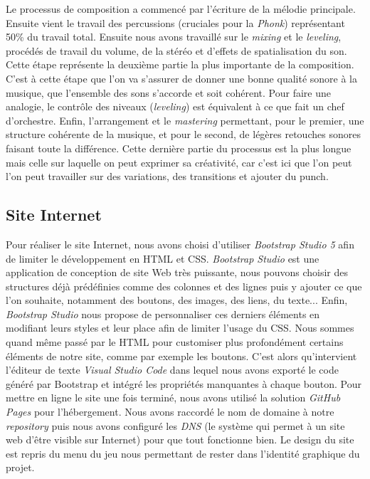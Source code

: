 \documentclass[12pt,a4paper]{article}
\begin{document}
        Le processus de composition a commencé par l'écriture de la mélodie principale. 
        Ensuite vient le travail des percussions (cruciales pour la \textsl{Phonk}) représentant 
        50\% du travail total. Ensuite nous avons travaillé sur le \textit{mixing} et 
        le \textit{leveling}, procédés de travail du volume, de la stéréo et d'effets de 
        spatialisation du son. Cette étape représente la deuxième partie la plus importante 
        de la composition. C'est à cette étape que l'on va s'assurer de donner une bonne qualité
        sonore à la musique, que l'ensemble des sons s'accorde et soit cohérent. Pour faire
        une analogie, le contrôle des niveaux (\textit{leveling}) est équivalent à ce que fait un chef
        d'orchestre. Enfin, l'arrangement et le \textit{mastering} permettant, pour le premier, une 
        structure cohérente de la musique, et pour le second, de légères retouches
        sonores faisant toute la différence. Cette dernière partie du processus 
        est la plus longue mais celle sur laquelle on peut exprimer sa créativité,
        car c'est ici que l'on peut l'on peut travailler sur des variations, 
        des transitions et ajouter du punch.
    
    \subsection{Site Internet}
        Pour réaliser le site Internet, nous avons choisi d'utiliser \textsl{Bootstrap 
        Studio 5} afin de limiter le développement en HTML et CSS. \textsl{Bootstrap 
        Studio} est une application de conception de site Web très puissante,
        nous pouvons choisir des structures déjà prédéfinies comme des colonnes
        et des lignes puis y ajouter ce que l'on souhaite, notamment des boutons, 
        des images, des liens, du texte... Enfin, \textsl{Bootstrap Studio} nous 
        propose de personnaliser ces derniers éléments en modifiant leurs styles 
        et leur place afin de limiter l'usage du CSS. Nous sommes quand même passé 
        par le HTML pour customiser plus profondément certains éléments de notre site,
        comme par exemple les boutons. C'est alors qu'intervient l'éditeur de texte
        \textsl{Visual Studio Code} dans lequel nous avons exporté le code généré 
        par Bootstrap et intégré les propriétés manquantes à chaque bouton. 
        Pour mettre en ligne le site une fois terminé, nous avons utilisé
        la solution \textsl{GitHub Pages} pour l'hébergement. Nous avons raccordé
        le nom de domaine à notre \textit{repository} puis nous avons configuré
        les \textit{DNS} (le système qui permet à un site web d'être visible sur
        Internet) pour que tout fonctionne bien. Le design du site est repris du
        menu du jeu nous permettant de rester dans l'identité graphique du projet.
    
\end{document}

